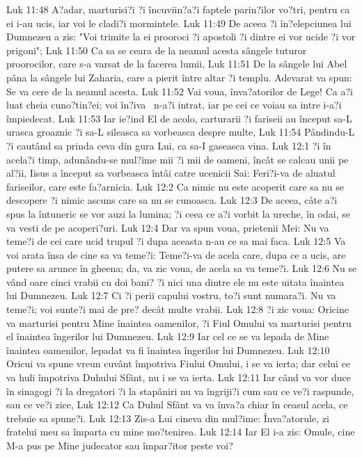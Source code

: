 Luk 11:48  A?adar, marturisi?i ?i încuviin?a?i faptele parin?ilor vo?tri, pentru ca ei i-au ucis, iar voi le cladi?i mormintele.
Luk 11:49  De aceea ?i în?elepciunea lui Dumnezeu a zis: "Voi trimite la ei prooroci ?i apostoli ?i dintre ei vor ucide ?i vor prigoni";
Luk 11:50  Ca sa se ceara de la neamul acesta sângele tuturor proorocilor, care s-a varsat de la facerea lumii,
Luk 11:51  De la sângele lui Abel pâna la sângele lui Zaharia, care a pierit între altar ?i templu. Adevarat va spun: Se va cere de la neamul acesta.
Luk 11:52  Vai voua, înva?atorilor de Lege! Ca a?i luat cheia cuno?tin?ei; voi în?iva  n-a?i intrat, iar pe cei ce voiau sa intre i-a?i împiedecat.
Luk 11:53  Iar ie?ind El de acolo, carturarii ?i fariseii au început sa-L urasca groaznic ?i sa-L sileasca sa vorbeasca despre multe,
Luk 11:54  Pândindu-L ?i cautând sa prinda ceva din gura Lui, ca sa-I gaseasca vina.
Luk 12:1  ?i în acela?i timp, adunându-se mul?ime mii ?i mii de oameni, încât se calcau unii pe al?ii, Iisus a început sa vorbeasca întâi catre ucenicii Sai: Feri?i-va de aluatul fariseilor, care este fa?arnicia.
Luk 12:2  Ca nimic nu este acoperit care sa nu se descopere ?i nimic ascuns care sa nu se cunoasca.
Luk 12:3  De aceea, câte a?i spus la întuneric se vor auzi la lumina; ?i ceea ce a?i vorbit la ureche, în odai, se va vesti de pe acoperi?uri.
Luk 12:4  Dar va spun voua, prietenii Mei: Nu va teme?i de cei care ucid trupul ?i dupa aceasta n-au ce sa mai faca.
Luk 12:5  Va voi arata însa de cine sa va teme?i: Teme?i-va de acela care, dupa ce a ucis, are putere sa arunce în gheena; da, va zic voua, de acela sa va teme?i.
Luk 12:6  Nu se vând oare cinci vrabii cu doi bani? ?i nici una dintre ele nu este uitata înaintea lui Dumnezeu.
Luk 12:7  Ci ?i perii capului vostru, to?i sunt numara?i. Nu va teme?i; voi sunte?i mai de pre? decât multe vrabii.
Luk 12:8  ?i zic voua: Oricine va marturisi pentru Mine înaintea oamenilor, ?i Fiul Omului va marturisi pentru el înaintea îngerilor lui Dumnezeu.
Luk 12:9  Iar cel ce se va lepada de Mine înaintea oamenilor, lepadat va fi înaintea îngerilor lui Dumnezeu.
Luk 12:10  Oricui va spune vreun cuvânt împotriva Fiului Omului, i se va ierta; dar celui ce va huli împotriva Duhului Sfânt, nu i se va ierta.
Luk 12:11  Iar când va vor duce în sinagogi ?i la dregatori ?i la stapâniri nu va îngriji?i cum sau ce ve?i raspunde, sau ce ve?i zice,
Luk 12:12  Ca Duhul Sfânt va va înva?a chiar în ceasul acela, ce trebuie sa spune?i.
Luk 12:13  Zis-a Lui cineva din mul?ime: Înva?atorule, zi fratelui meu sa împarta cu mine mo?tenirea.
Luk 12:14  Iar El i-a zis: Omule, cine M-a pus pe Mine judecator sau împar?itor peste voi?
